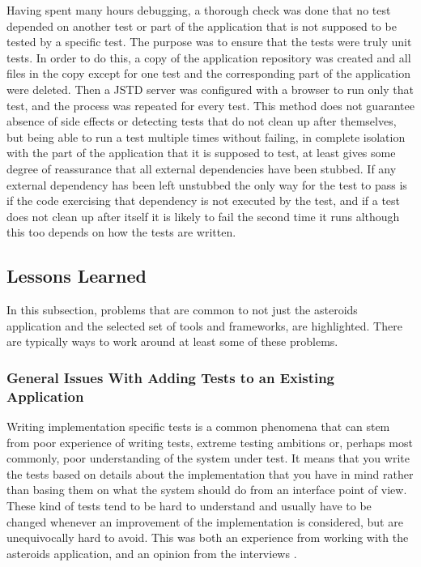 \documentclass[11pt]{article}
\begin{document}
Having spent many hours debugging, a thorough check was done that no test depended on another test or part of the application that is not supposed to be tested by a specific test. The purpose was to ensure that the tests were truly unit tests. In order to do this, a copy of the application repository was created and all files in the copy except for one test and the corresponding part of the application were deleted. Then a JSTD server was configured with a browser to run only that test, and the process was repeated for every test. This method does not guarantee absence of side effects or detecting tests that do not clean up after themselves, but being able to run a test multiple times without failing, in complete isolation with the part of the application that it is supposed to test, at least gives some degree of reassurance that all external dependencies have been stubbed. If any external dependency has been left unstubbed the only way for the test to pass is if the code exercising that dependency is not executed by the test, and if a test does not clean up after itself it is likely to fail the second time it runs although this too depends on how the tests are written.

\subsection{Lessons Learned}

In this subsection, problems that are common to not just the asteroids application and the selected set of tools and frameworks, are highlighted. There are typically ways to work around at least some of these problems.

\subsubsection{General Issues With Adding Tests to an Existing Application}
\label{subsec:coveragecriteria}

Writing implementation specific tests is a common phenomena that can stem from poor experience of writing tests, extreme testing ambitions or, perhaps most commonly, poor understanding of the system under test. It means that you write the tests based on details about the implementation that you have in mind rather than basing them on what the system should do from an interface point of view. These kind of tests tend to be hard to understand and usually have to be changed whenever an improvement of the implementation is considered, but are unequivocally hard to avoid. This was both an experience from working with the asteroids application, and an opinion from the interviews \cite[question~38]{Rovegard}.
\end{document}
